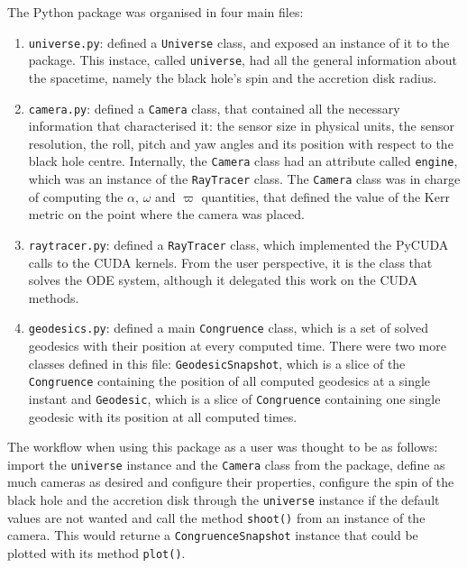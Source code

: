 The Python package was organised in four main files:
\begin{enumerate}
	\item \lstinline{universe.py}: defined a \lstinline{Universe} class, and exposed an instance of it to the package. This instace, called \lstinline{universe}, had all the general information about the spacetime, namely the black hole's spin and the accretion disk radius.
	\item \lstinline{camera.py}: defined a \lstinline{Camera} class, that contained all the necessary information that characterised it: the sensor size in physical units, the sensor resolution, the roll, pitch and yaw angles and its position with respect to the black hole centre. Internally, the \lstinline{Camera} class had an attribute called \lstinline{engine}, which was an instance of the \lstinline{RayTracer} class. The \lstinline{Camera} class was in charge of computing the $\alpha$, $\omega$ and $\varpi$ quantities, that defined the value of the Kerr metric on the point where the camera was placed.
	\item \lstinline{raytracer.py}: defined a \lstinline{RayTracer} class, which implemented the PyCUDA calls to the \ac{CUDA} kernels. From the user perspective, it is the class that solves the \ac{ODE} system, although it delegated this work on the \ac{CUDA} methods.
	\item \lstinline{geodesics.py}: defined a main \lstinline{Congruence} class, which is a set of solved geodesics with their position at every computed time. There were two more classes defined in this file: \lstinline{GeodesicSnapshot}, which is a slice of the \lstinline{Congruence} containing the position of all computed geodesics at a single instant and \lstinline{Geodesic}, which is a slice of \lstinline{Congruence} containing one single geodesic with its position at all computed times.
\end{enumerate}

The workflow when using this package as a user was thought to be as follows: import the \lstinline{universe} instance and the \lstinline{Camera} class from the package, define as much cameras as desired and configure their properties, configure the spin of the black hole and the accretion disk through the \lstinline{universe} instance if the default values are not wanted and call the method \lstinline{shoot()} from an instance of the camera. This would returne a \lstinline{CongruenceSnapshot} instance that could be plotted with its method \lstinline{plot()}.

